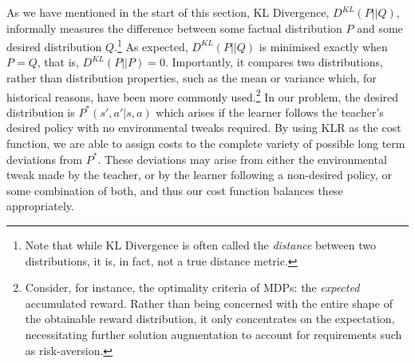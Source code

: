 As we have mentioned in the start of this section, KL Divergence,
$D^{KL}(P||Q)$, informally measures the difference between some
factual distribution $P$ and some desired distribution
$Q$.\footnote{Note that while KL Divergence is often called the
  \emph{distance} between two distributions, it is, in fact, not a
  true distance metric.}  As expected, $D^{KL}(P||Q)$ is minimised
exactly when $P=Q$, that is, $D^{KL}(P||P)=0$. Importantly, it
compares two distributions, rather than distribution properties, such
as the mean or variance which, for historical reasons, have been more
commonly used.\footnote{Consider, for instance, the optimality
  criteria of MDPs: the {\em expected} accumulated reward. Rather than
  being concerned with the entire shape of the obtainable reward
  distribution, it only concentrates on the expectation, necessitating
  further solution augmentation to account for requirements such as
  risk-aversion.}  In our problem, the desired distribution is
$P^*(s',a'|s,a)$ which arises if the learner follows the teacher's
desired policy with no environmental tweaks required.  By using KLR as
the cost function, we are able to assign costs to the complete variety
of possible long term deviations from $P^*$.%
These deviations
may arise from either the environmental tweak made by the teacher, or
by the learner following a non-desired policy, or some combination of
both, and thus our cost function balances these appropriately.





